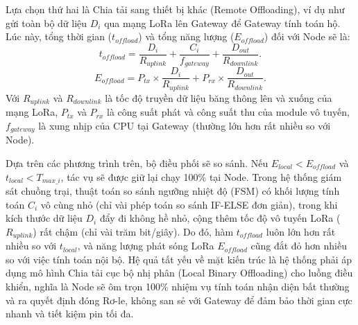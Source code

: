 Lựa chọn thứ hai là Chia tải sang thiết bị khác (Remote Offloading), ví dụ như gửi toàn bộ dữ liệu $D_i$ qua mạng LoRa lên Gateway để Gateway tính toán hộ. Lúc này, tổng thời gian ($t_{offload}$) và tổng năng lượng ($E_{offload}$) \cite{mach2017mobile}đối với Node sẽ là:
\begin{equation}
    t_{offload} = \frac{D_i}{R_{uplink}} + \frac{C_i}{f_{gateway}} + \frac{D_{out}}{R_{downlink}}.
\end{equation}
\begin{equation}
    E_{offload} = P_{tx} \times \frac{D_i}{R_{uplink}} + P_{rx} \times \frac{D_{out}}{R_{downlink}}.
\end{equation}
Với $R_{uplink}$ và $R_{downlink}$ là tốc độ truyền dữ liệu băng thông lên và xuống của mạng LoRa, $P_{tx}$ và $P_{rx}$ là công suất phát và công suất thu của module vô tuyến, $f_{gateway}$ là xung nhịp của CPU tại Gateway (thường lớn hơn rất nhiều so với Node).

Dựa trên các phương trình trên, bộ điều phối sẽ so sánh. Nếu $E_{local} < E_{offload}$ và $t_{local} < T_{max\_i}$, tác vụ sẽ được giữ lại chạy 100\% tại Node. Trong hệ thống giám sát chuồng trại, thuật toán so sánh ngưỡng nhiệt độ (FSM) có khối lượng tính toán $C_i$ vô cùng nhỏ (chỉ vài phép toán so sánh IF-ELSE đơn giản), trong khi kích thước dữ liệu $D_i$ đẩy đi không hề nhỏ, cộng thêm tốc độ vô tuyến LoRa ($R_{uplink}$) rất chậm (chỉ vài trăm bit/giây). Do đó, hàm $t_{offload}$ luôn lớn hơn rất nhiều so với $t_{local}$, và năng lượng phát sóng LoRa $E_{offload}$ cũng đắt đỏ hơn nhiều so với việc tính toán nội bộ. Hệ quả tất yếu về mặt kiến trúc là hệ thống phải áp dụng mô hình Chia tải cục bộ nhị phân (Local Binary Offloading) cho luồng điều khiển, nghĩa là Node sẽ ôm trọn 100\% nhiệm vụ tính toán nhận diện bất thường và ra quyết định đóng Rơ-le, không san sẻ với Gateway để đảm bảo thời gian cực nhanh và tiết kiệm pin tối đa.
